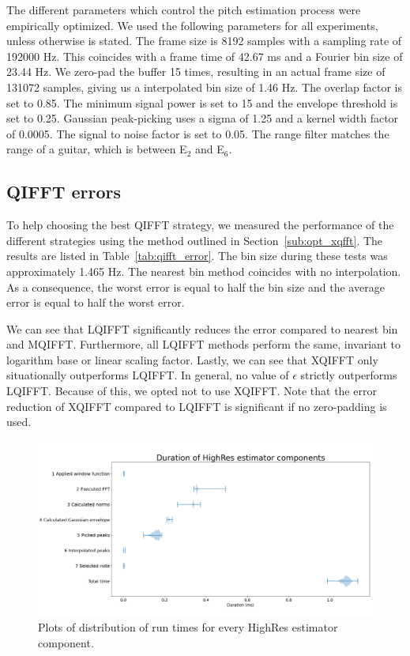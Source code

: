\documentclass[a4paper,10pt,twocolumn]{article}
\newcommand{\note}[2]{#1${}_{#2}$}
\begin{document}
The different parameters which control the pitch estimation process were empirically optimized. We used the following parameters for all experiments, unless otherwise is stated. The frame size is 8192 samples with a sampling rate of 192000 Hz. This coincides with a frame time of 42.67 ms and a Fourier bin size of 23.44 Hz. We zero-pad the buffer 15 times, resulting in an actual frame size of 131072 samples, giving us a interpolated bin size of 1.46 Hz. The overlap factor is set to 0.85. The minimum signal power is set to 15 and the envelope threshold is set to 0.25. Gaussian peak-picking uses a sigma of 1.25 and a kernel width factor of 0.0005. The signal to noise factor is set to 0.05. The range filter matches the range of a guitar, which is between \note{E}{2} and \note{E}{6}.


\vfill
\subsection{QIFFT errors}  \label{sub:exp:qifft}
To help choosing the best QIFFT strategy, we measured the performance of the different strategies using the method outlined in Section~\ref{sub:opt_xqfft}. The results are listed in Table~\ref{tab:qifft_error}. The bin size during these tests was approximately 1.465 Hz. The nearest bin method coincides with no interpolation. As a consequence, the worst error is equal to half the bin size and the average error is equal to half the worst error.

We can see that LQIFFT significantly reduces the error compared to nearest bin and MQIFFT. Furthermore, all LQIFFT methods perform the same, invariant to logarithm base or linear scaling factor. Lastly, we can see that XQIFFT only situationally outperforms LQIFFT. In general, no value of $\epsilon$ strictly outperforms LQIFFT. Because of this, we opted not to use XQIFFT. Note that the error reduction of XQIFFT compared to LQIFFT is significant if no zero-padding is used.
\begin{figure}[b!]
    \centering
    \includegraphics[width=\linewidth]{fig/perfplot3.png}
    \caption{Plots of distribution of run times for every HighRes estimator component.} %
    \label{fig:plotspeed}
\end{figure}
\pagebreak
\end{document}
